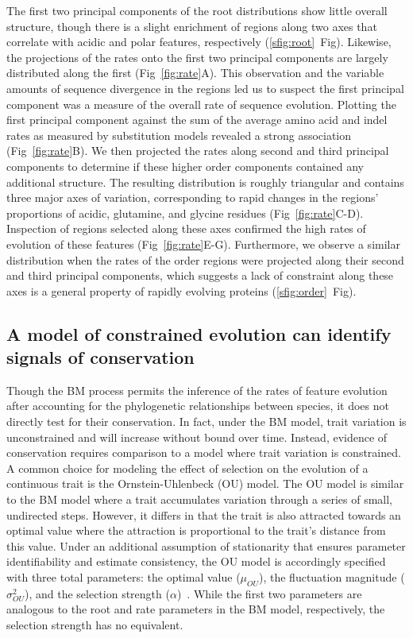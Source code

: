 The first two principal components of the root distributions show little overall structure, though there is a slight enrichment of regions along two axes that correlate with acidic and polar features, respectively (\ref{sfig:root}~Fig). Likewise, the projections of the rates onto the first two principal components are largely distributed along the first (Fig~\ref{fig:rate}A). This observation and the variable amounts of sequence divergence in the regions led us to suspect the first principal component was a measure of the overall rate of sequence evolution. Plotting the first principal component against the sum of the average amino acid and indel rates as measured by substitution models revealed a strong association (Fig~\ref{fig:rate}B). We then projected the rates along second and third principal components to determine if these higher order components contained any additional structure. The resulting distribution is roughly triangular and contains three major axes of variation, corresponding to rapid changes in the regions' proportions of acidic, glutamine, and glycine residues (Fig~\ref{fig:rate}C-D). Inspection of regions selected along these axes confirmed the high rates of evolution of these features (Fig~\ref{fig:rate}E-G). Furthermore, we observe a similar distribution when the rates of the order regions were projected along their second and third principal components, which suggests a lack of constraint along these axes is a general property of rapidly evolving proteins (\ref{sfig:order}~Fig).

\subsection{A model of constrained evolution can identify signals of conservation}
Though the BM process permits the inference of the rates of feature evolution after accounting for the phylogenetic relationships between species, it does not directly test for their conservation. In fact, under the BM model, trait variation is unconstrained and will increase without bound over time. Instead, evidence of conservation requires comparison to a model where trait variation is constrained. A common choice for modeling the effect of selection on the evolution of a continuous trait is the Ornstein-Uhlenbeck (OU) model. The OU model is similar to the BM model where a trait accumulates variation through a series of small, undirected steps. However, it differs in that the trait is also attracted towards an optimal value where the attraction is proportional to the trait's distance from this value. Under an additional assumption of stationarity that ensures parameter identifiability and estimate consistency, the OU model is accordingly specified with three total parameters: the optimal value ($\mu_{OU}$), the fluctuation magnitude ($\sigma^2_{OU}$), and the selection strength ($\alpha$)~\cite{Ho2013, Ho2014}. While the first two parameters are analogous to the root and rate parameters in the BM model, respectively, the selection strength has no equivalent.

